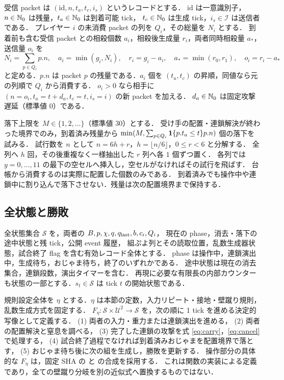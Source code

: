 受信 packet は $(\mathrm{id},n,t_a,t_c,i_s)$ というレコードとする．
$\mathrm{id}$ は一意識別子，$n\in\mathbb{N}_0$ は残量，$t_a\in\mathbb{N}_0$ は到着可能 tick，
$t_c\in\mathbb{N}_0$ は生成 tick，$i_s\in\mathcal I$ は送信者である．
プレイヤー $i$ の未消費 packet の列を $Q_i$，その総量を $N_i$ とする．
到着前も含む受信 packet との相殺個数 $a_i$，相殺後生成量 $r_i$，両者同時相殺量 $a_*$，送信量 $o_i$ を
\begin{equation}\label{eq:cancel}
 N_i=\sum_{p\in Q_i}p.n,\quad a_i=\min(g_i,N_i),\quad
 r_i=g_i-a_i,\quad a_*=\min(r_0,r_1),\quad o_i=r_i-a_*
\end{equation}
と定める．$p.n$ は packet $p$ の残量である．$a_i$ 個を $(t_a,t_c)$ の昇順，同値なら元の列順で $Q_i$ から消費する．
$o_i>0$ なら相手に $(n=o_i,t_a=t+d_a,t_c=t,i_s=i)$ の新 packet を加える．
$d_a\in\mathbb{N}_0$ は固定攻撃遅延（標準値 $0$）である．

落下上限を $M\in\{1,2,\ldots\}$（標準値 $30$）とする．
受け手の配置・連鎖解決が終わった境界でのみ，到着済み残量から
$\min(M,\sum_{p\in Q_i}\mathbf{1}\{p.t_a\le t\}p.n)$ 個の落下を試みる．
試行数を $n$ として $n=6h+r$，$h=\lfloor n/6\rfloor$，$0\le r<6$ と分解する．
全列へ $h$ 回，その後重複なく一様抽出した $r$ 列へ各 $1$ 個ずつ置く．
各列では $y=0,\ldots,11$ の最下の空セルへ挿入し，空セルがなければその試行を飛ばす．
台帳から消費するのは実際に配置した個数のみである．
到着済みでも操作中や連鎖中に割り込んで落下させない．残量は次の配置境界まで保持する．

\subsection{全状態と勝敗}
\begin{definition}[実時間状態と遷移]\label{def:state}
全状態集合 $\mathcal S$ を，両者の $B,p,\chi,q,q_{\rm last},b,c_i,Q_i$，
現在の phase，消去・落下の途中状態と残 tick，公開 event 履歴，
組ぷよ列とその読取位置，乱数生成器状態，試合終了 flag を含む有効レコード全体とする．
phase は操作中，連鎖演出中，生成待ち，おじゃま待ち，終了のいずれかである．
途中状態は現在の消去集合，連鎖段数，演出タイマーを含む．
再現に必要な有限長の内部カウンターも状態の一部とする．$s_t\in\mathcal S$ は tick $t$ の開始状態である．

規則設定全体を $\eta$ とする．$\eta$ は本節の定数，入力リピート・接地・壁蹴り規則，乱数生成方式を固定する．
$F_\eta:\mathcal S\times\mathcal U^2\to\mathcal S$ を，次の順に 1 tick を進める決定的写像として定義する．
(1) 両者の入力・重力または連鎖演出を進める，
(2) 両者の配置解決と窒息を調べる，
(3) 完了した連鎖の攻撃を式 \eqref{eq:carry}，\eqref{eq:cancel} で処理する，
(4) 試合終了過程でなければ到着済みおじゃまを配置境界で落とす，
(5) おじゃま待ち後に次の組を生成し，勝敗を更新する．
操作部分の具体的な $F_\eta$ は，固定 SHA の
 と
 の合成を採用する．
これは関数の実装による定義であり，全ての壁蹴り分岐を別の近似式へ置換するものではない．
\end{definition}

